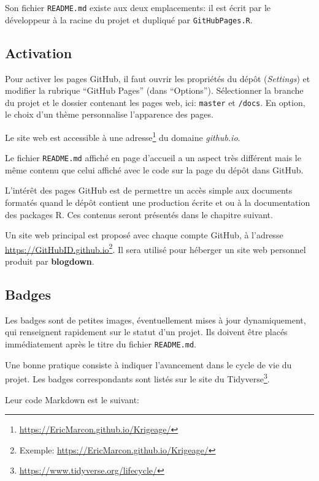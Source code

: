 \documentclass[
  12pt,
  french,
  a4paper,
  extrafontsizes,onecolumn,openright
  ]{memoir}
\begin{document}
Son fichier \texttt{README.md} existe aux deux emplacements: il est écrit par le développeur à la racine du projet et dupliqué par \texttt{GitHubPages.R}.

\hypertarget{activation}{%
\subsection{Activation}\label{activation}}

Pour activer les pages GitHub, il faut ouvrir les propriétés du dépôt (\emph{Settings}) et modifier la rubrique \enquote{GitHub Pages} (dans \enquote{Options}).
Sélectionner la branche du projet et le dossier contenant les pages web, ici: \texttt{master} et \texttt{/docs}.
En option, le choix d'un thème personnalise l'apparence des pages.

Le site web est accessible à une adresse\footnote{\url{https://EricMarcon.github.io/Krigeage/}} du domaine \emph{github.io}.

Le fichier \texttt{README.md} affiché en page d'accueil a un aspect très différent mais le même contenu que celui affiché avec le code sur la page du dépôt dans GitHub.

L'intérêt des pages GitHub est de permettre un accès simple aux documents formatés quand le dépôt contient une production écrite et ou à la documentation des packages R.
Ces contenus seront présentés dans le chapitre suivant.

Un site web principal est proposé avec chaque compte GitHub, à l'adresse \url{https://GitHubID.github.io}\footnote{Exemple: \url{https://EricMarcon.github.io/Krigeage/}}.
Il sera utilisé pour héberger un site web personnel produit par \textbf{blogdown}.

\hypertarget{badges}{%
\subsection{Badges}\label{badges}}

Les badges sont de petites images, éventuellement mises à jour dynamiquement, qui renseignent rapidement sur le statut d'un projet.
Ils doivent être placés immédiatement après le titre du fichier \texttt{README.md}.

Une bonne pratique consiste à indiquer l'avancement dans le cycle de vie du projet.
Les badges correspondants sont listés sur le site du Tidyverse\footnote{\url{https://www.tidyverse.org/lifecycle/}}.

Leur code Markdown est le suivant:
\end{document}
